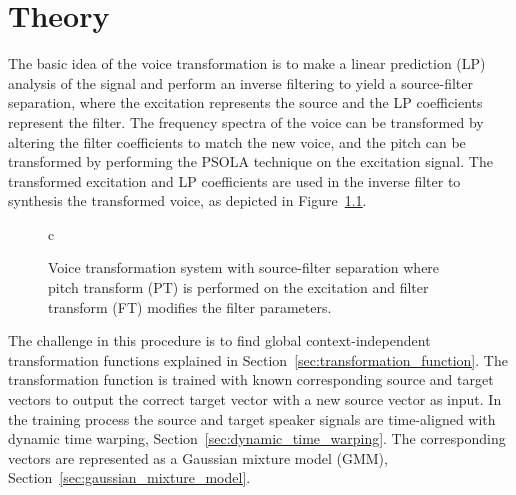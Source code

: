 \chapter{Theory} %
\label{cha:theory}

The basic idea of the voice transformation is to make a linear prediction (LP) analysis of the signal and perform an inverse filtering to yield a source-filter separation, where the excitation represents the source and the LP coefficients represent the filter. The frequency spectra of the voice can be transformed by altering the filter coefficients to match the new voice, and the pitch can be transformed by performing the PSOLA technique on the excitation signal. The transformed excitation and LP coefficients are used in the inverse filter to synthesis the transformed voice, as depicted in Figure~\ref{fig:transformation_system}.
\begin{figure}[htbp]
  \begin{center}
  \begin{tabular}[h]{c}
  \end{tabular}
  \caption{Voice transformation system with source-filter separation where pitch transform (PT) is performed on the excitation and filter transform (FT) modifies the filter parameters.}
  \label{fig:transformation_system}
  \end{center}
\end{figure}
 

The challenge in this procedure is to find global context-independent transformation functions explained in Section~\ref{sec:transformation_function}. The transformation function is trained with known corresponding source and target vectors to output the correct target vector with a new source vector as input. In the training process the source and target speaker signals are time-aligned with dynamic time warping, Section~\ref{sec:dynamic_time_warping}. The corresponding vectors are represented as a Gaussian mixture model (GMM), Section~\ref{sec:gaussian_mixture_model}.


